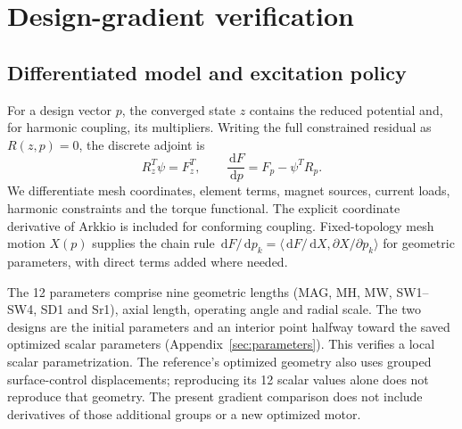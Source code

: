 \documentclass{anvil-paper}
\newcommand{\dd}{\,\mathrm{d}}
\begin{document}
\section{Design-gradient verification}\label{sec:gradients}
\subsection{Differentiated model and excitation policy}
For a design vector $p$, the converged state $z$ contains the reduced
potential and, for harmonic coupling, its multipliers. Writing the full
constrained residual as $R(z,p)=0$, the discrete adjoint is
\begin{equation}
 R_z^T\psi=F_z^T,\qquad
 \frac{\dd F}{\dd p}=F_p-\psi^T R_p.
 \label{eq:adjoint}
\end{equation}
We differentiate mesh coordinates, element terms, magnet sources, current
loads, harmonic constraints and the torque functional. The explicit
coordinate derivative of Arkkio is included for conforming coupling.
Fixed-topology mesh motion $X(p)$ supplies the chain rule
$\dd F/\dd p_k=\langle\dd F/\dd X,\partial X/\partial p_k\rangle$
for geometric parameters, with direct terms added where needed.

The 12 parameters comprise nine geometric lengths (MAG, MH, MW,
SW1--SW4, SD1 and Sr1), axial length, operating angle and radial scale.
The two designs are the initial parameters and an interior point halfway
toward the saved optimized scalar parameters
(Appendix~\ref{sec:parameters}). This verifies a local scalar
parametrization. The reference's optimized geometry also uses grouped
surface-control displacements; reproducing its 12 scalar values alone
does not reproduce that geometry. The present gradient comparison does
not include derivatives of those additional groups or a new optimized
motor.
\end{document}
